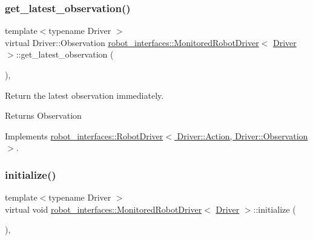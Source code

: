 \subsubsection{\texorpdfstring{get\+\_\+latest\+\_\+observation()}{get\_latest\_observation()}}
{\footnotesize\ttfamily template$<$typename Driver $>$ \\
virtual Driver\+::\+Observation \hyperlink{classrobot__interfaces_1_1MonitoredRobotDriver}{robot\+\_\+interfaces\+::\+Monitored\+Robot\+Driver}$<$ \hyperlink{classDriver}{Driver} $>$\+::get\+\_\+latest\+\_\+observation (\begin{DoxyParamCaption}{ }\end{DoxyParamCaption})\hspace{0.3cm}{\ttfamily [inline]}, {\ttfamily [virtual]}}



Return the latest observation immediately. 

\begin{DoxyReturn}{Returns}
Observation 
\end{DoxyReturn}


Implements \hyperlink{classrobot__interfaces_1_1RobotDriver_ad13d4f4fdfe78bdde4fc964f07fa45e2}{robot\+\_\+interfaces\+::\+Robot\+Driver$<$ Driver\+::\+Action, Driver\+::\+Observation $>$}.

\mbox{\label{classrobot__interfaces_1_1MonitoredRobotDriver_a47b68c24afaa087e4e60e6413ab7ac89}} 
\subsubsection{\texorpdfstring{initialize()}{initialize()}}
{\footnotesize\ttfamily template$<$typename Driver $>$ \\
virtual void \hyperlink{classrobot__interfaces_1_1MonitoredRobotDriver}{robot\+\_\+interfaces\+::\+Monitored\+Robot\+Driver}$<$ \hyperlink{classDriver}{Driver} $>$\+::initialize (\begin{DoxyParamCaption}{ }\end{DoxyParamCaption})\hspace{0.3cm}{\ttfamily [inline]}, {\ttfamily [virtual]}}




